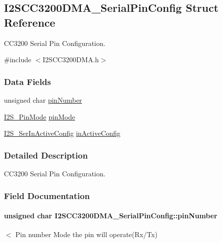 \subsection{I2\+S\+C\+C3200\+D\+M\+A\+\_\+\+Serial\+Pin\+Config Struct Reference}
\label{struct_i2_s_c_c3200_d_m_a___serial_pin_config}


C\+C3200 Serial Pin Configuration.  




{\ttfamily \#include $<$I2\+S\+C\+C3200\+D\+M\+A.\+h$>$}

\subsubsection*{Data Fields}
\begin{DoxyCompactItemize}
\item 
unsigned char \hyperlink{struct_i2_s_c_c3200_d_m_a___serial_pin_config_a318ab59b283cc5702ec0c406a3b1fa39}{pin\+Number}
\item 
\hyperlink{_i2_s_8h_a68adf81f32430f87478afbc63e0623af}{I2\+S\+\_\+\+Pin\+Mode} \hyperlink{struct_i2_s_c_c3200_d_m_a___serial_pin_config_a46db8b0004dfc5fda168e243f5f583f7}{pin\+Mode}
\item 
\hyperlink{_i2_s_8h_a59a8a15850cffe145050ee9f0958bcd3}{I2\+S\+\_\+\+Ser\+In\+Active\+Config} \hyperlink{struct_i2_s_c_c3200_d_m_a___serial_pin_config_ad033e14336b2398851bccb7f738dcbf1}{in\+Active\+Config}
\end{DoxyCompactItemize}


\subsubsection{Detailed Description}
C\+C3200 Serial Pin Configuration. 

\subsubsection{Field Documentation}
\paragraph[{pin\+Number}]{\setlength{\rightskip}{0pt plus 5cm}unsigned char I2\+S\+C\+C3200\+D\+M\+A\+\_\+\+Serial\+Pin\+Config\+::pin\+Number}\label{struct_i2_s_c_c3200_d_m_a___serial_pin_config_a318ab59b283cc5702ec0c406a3b1fa39}
$<$ Pin number Mode the pin will operate(Rx/\+Tx) 
